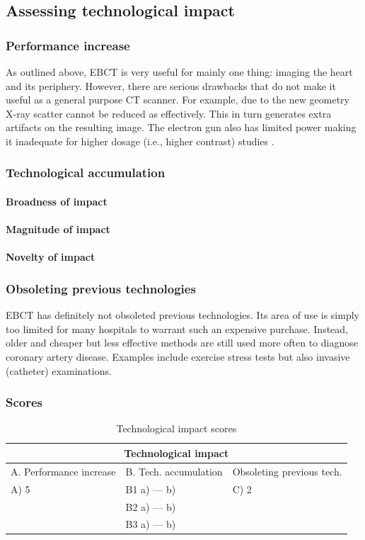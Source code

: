 \subsection{Assessing technological impact}
\subsubsection{Performance increase}
As outlined above, EBCT is very useful for mainly one thing: imaging the heart
and its periphery. However, there are serious drawbacks that do not make it
useful as a general purpose CT scanner. For example, due to the new geometry
X-ray scatter cannot be reduced as effectively. This in turn generates extra
artifacts on the resulting image. The electron gun also has limited power making
it inadequate for higher dosage (i.e., higher contrast) studies \cite{multictbook}.

\subsubsection{Technological accumulation}
\paragraph{Broadness of impact}

\paragraph{Magnitude of impact}

\paragraph{Novelty of impact}

\subsubsection{Obsoleting previous technologies}
EBCT has definitely not obsoleted previous technologies. Its area of use is
simply too limited for many hospitals to warrant such an expensive purchase.
Instead, older and cheaper but less effective methods are still used more often
to diagnose coronary artery disease. Examples include exercise stress tests but
also invasive (catheter) examinations.

\subsubsection{Scores}
\begin{table}[h]
\centering
\begin{tabular}{l l l}
\hline
\multicolumn{3}{|c|}{Technological impact} \\
\hline
A. Performance increase & B. Tech. accumulation & Obsoleting previous tech.\\
A) 5 & B1 a)  --- b)  & C) 2\\ 
     & B2 a)  --- b)  & \\
     & B3 a)  --- b)  & \\
\hline
\end{tabular}
\caption{Technological impact scores}
\label{tbl:impactscores2}
\end{table}